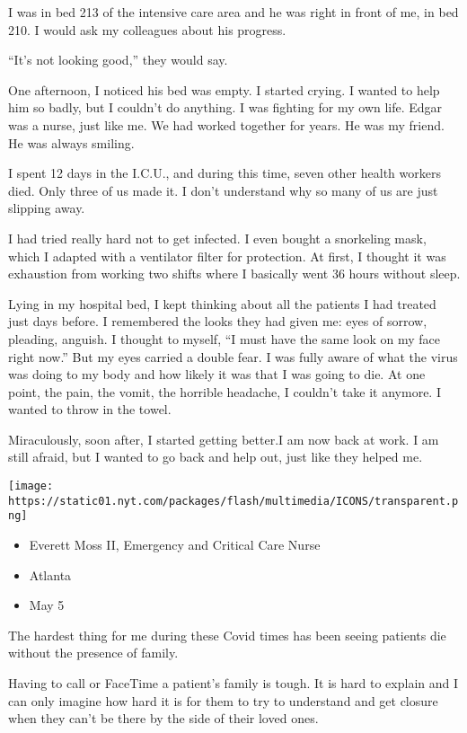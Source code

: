 I was in bed 213 of the intensive care area and he was right in front of
me, in bed 210. I would ask my colleagues about his progress.

``It's not looking good,'' they would say.

One afternoon, I noticed his bed was empty. I started crying. I wanted
to help him so badly, but I couldn't do anything. I was fighting for my
own life. Edgar was a nurse, just like me. We had worked together for
years. He was my friend. He was always smiling.

I spent 12 days in the I.C.U., and during this time, seven other health
workers died. Only three of us made it. I don't understand why so many
of us are just slipping away.

I had tried really hard not to get infected. I even bought a snorkeling
mask, which I adapted with a ventilator filter for protection. At first,
I thought it was exhaustion from working two shifts where I basically
went 36 hours without sleep.

Lying in my hospital bed, I kept thinking about all the patients I had
treated just days before. I remembered the looks they had given me: eyes
of sorrow, pleading, anguish. I thought to myself, ``I must have the
same look on my face right now.'' But my eyes carried a double fear. I
was fully aware of what the virus was doing to my body and how likely it
was that I was going to die. At one point, the pain, the vomit, the
horrible headache, I couldn't take it anymore. I wanted to throw in the
towel.

Miraculously, soon after, I started getting better.I am now back at
work. I am still afraid, but I wanted to go back and help out, just like
they helped me.

\texttt{[image: https://static01.nyt.com/packages/flash/multimedia/ICONS/transparent.png]}

\begin{itemize}
\tightlist
\item
  Everett Moss II, Emergency and Critical Care Nurse
\item
  Atlanta
\item
  May 5
\end{itemize}

The hardest thing for me during these Covid times has been seeing
patients die without the presence of family.

Having to call or FaceTime a patient's family is tough. It is hard to
explain and I can only imagine how hard it is for them to try to
understand and get closure when they can't be there by the side of their
loved ones.


